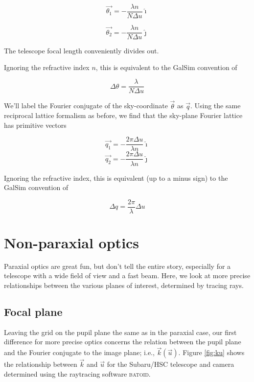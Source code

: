 \documentclass{article}
\begin{document}
\begin{equation}
    \vec{\theta_1} = -\frac{\lambda n}{N \Delta u} \hat{\imath}
\end{equation}

\begin{equation}
    \vec{\theta_2} = -\frac{\lambda n}{N \Delta u} \hat{\jmath}
\end{equation}

The telescope focal length conveniently divides out.

Ignoring the refractive index $n$, this is equivalent to the GalSim convention of

\begin{equation}
    \Delta \theta = \frac{\lambda}{N \Delta u}
\end{equation}

We'll label the Fourier conjugate of the sky-coordinate $\vec{\theta}$ as $\vec{q}$.  Using the same
reciprocal lattice formalism as before, we find that the sky-plane Fourier lattice has primitive
vectors

\begin{equation}
    \vec{q_1} = -\frac{2 \pi \Delta u}{\lambda n} \hat{\imath}
\end{equation}
\begin{equation}
    \vec{q_2} = -\frac{2 \pi \Delta u}{\lambda n} \hat{\jmath}
\end{equation}

Ignoring the refractive index, this is equivalent (up to a minus sign) to the GalSim convention of

\begin{equation}
    \Delta q = \frac{2 \pi}{\lambda} \Delta u
\end{equation}

\section{Non-paraxial optics}

Paraxial optics are great fun, but don't tell the entire story, especially for a telescope with a
wide field of view and a fast beam.  Here, we look at more precise relationships between the various
planes of interest, determined by tracing rays.

\subsection{Focal plane}

Leaving the grid on the pupil plane the same as in the paraxial case, our first difference for more
precise optics concerns the relation between the pupil plane and the Fourier conjugate to the image
plane; i.e., $\vec{k}(\vec{u})$.  Figure \ref{fig:ku} shows the relationship between $\vec{k}$ and
$\vec{u}$ for the Subaru/HSC telescope and camera determined using the raytracing software \textsc{batoid}.
\end{document}
